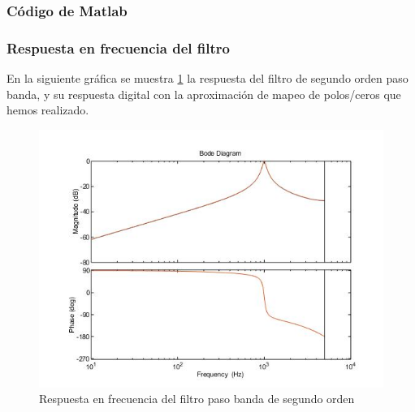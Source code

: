 \documentclass[titlepage]{article}
\begin{document}
\subsubsection{Código de Matlab}

\subsubsection{Respuesta en frecuencia del filtro}
En la siguiente gráfica se muestra \ref{fig:bandpassdiscrete} la respuesta del filtro de segundo orden paso banda, y su respuesta digital con la aproximación de mapeo de polos/ceros que hemos realizado. 
\begin{figure}[H]
  \centering
	\includegraphics[scale=0.5]{bandpassdiscrete}
  \caption{Respuesta en frecuencia del filtro paso banda de segundo orden}
  \label{fig:bandpassdiscrete}
\end{figure}
\end{document}

